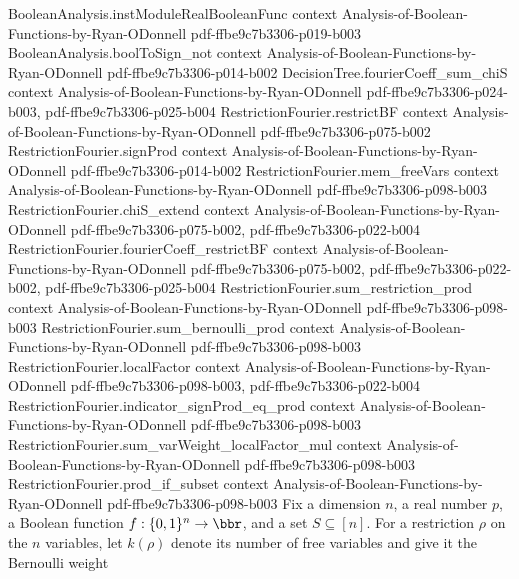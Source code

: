\begin{theorem}
\proofstep
  {BooleanAnalysis.instModuleRealBooleanFunc}
  {context}
  {Analysis-of-Boolean-Functions-by-Ryan-ODonnell}
  {pdf-ffbe9c7b3306-p019-b003}
\proofstep
  {BooleanAnalysis.boolToSign_not}
  {context}
  {Analysis-of-Boolean-Functions-by-Ryan-ODonnell}
  {pdf-ffbe9c7b3306-p014-b002}
\proofstep
  {DecisionTree.fourierCoeff_sum_chiS}
  {context}
  {Analysis-of-Boolean-Functions-by-Ryan-ODonnell}
  {pdf-ffbe9c7b3306-p024-b003,
    pdf-ffbe9c7b3306-p025-b004}
\proofstep
  {RestrictionFourier.restrictBF}
  {context}
  {Analysis-of-Boolean-Functions-by-Ryan-ODonnell}
  {pdf-ffbe9c7b3306-p075-b002}
\proofstep
  {RestrictionFourier.signProd}
  {context}
  {Analysis-of-Boolean-Functions-by-Ryan-ODonnell}
  {pdf-ffbe9c7b3306-p014-b002}
\proofstep
  {RestrictionFourier.mem_freeVars}
  {context}
  {Analysis-of-Boolean-Functions-by-Ryan-ODonnell}
  {pdf-ffbe9c7b3306-p098-b003}
\proofstep
  {RestrictionFourier.chiS_extend}
  {context}
  {Analysis-of-Boolean-Functions-by-Ryan-ODonnell}
  {pdf-ffbe9c7b3306-p075-b002,
    pdf-ffbe9c7b3306-p022-b004}
\proofstep
  {RestrictionFourier.fourierCoeff_restrictBF}
  {context}
  {Analysis-of-Boolean-Functions-by-Ryan-ODonnell}
  {pdf-ffbe9c7b3306-p075-b002,
    pdf-ffbe9c7b3306-p022-b002,
    pdf-ffbe9c7b3306-p025-b004}
\proofstep
  {RestrictionFourier.sum_restriction_prod}
  {context}
  {Analysis-of-Boolean-Functions-by-Ryan-ODonnell}
  {pdf-ffbe9c7b3306-p098-b003}
\proofstep
  {RestrictionFourier.sum_bernoulli_prod}
  {context}
  {Analysis-of-Boolean-Functions-by-Ryan-ODonnell}
  {pdf-ffbe9c7b3306-p098-b003}
\proofstep
  {RestrictionFourier.localFactor}
  {context}
  {Analysis-of-Boolean-Functions-by-Ryan-ODonnell}
  {pdf-ffbe9c7b3306-p098-b003,
    pdf-ffbe9c7b3306-p022-b004}
\proofstep
  {RestrictionFourier.indicator_signProd_eq_prod}
  {context}
  {Analysis-of-Boolean-Functions-by-Ryan-ODonnell}
  {pdf-ffbe9c7b3306-p098-b003}
\proofstep
  {RestrictionFourier.sum_varWeight_localFactor_mul}
  {context}
  {Analysis-of-Boolean-Functions-by-Ryan-ODonnell}
  {pdf-ffbe9c7b3306-p098-b003}
\proofstep
  {RestrictionFourier.prod_if_subset}
  {context}
  {Analysis-of-Boolean-Functions-by-Ryan-ODonnell}
  {pdf-ffbe9c7b3306-p098-b003}
Fix a dimension $n$, a real number $p$, a Boolean function $f:\{0,1\}^n\to\bbr$, and a
set $S\subseteq[n]$. For a restriction $\rho$ on the $n$ variables, let $k(\rho)$ denote
its number of free variables and give it the Bernoulli weight

\end{theorem}

